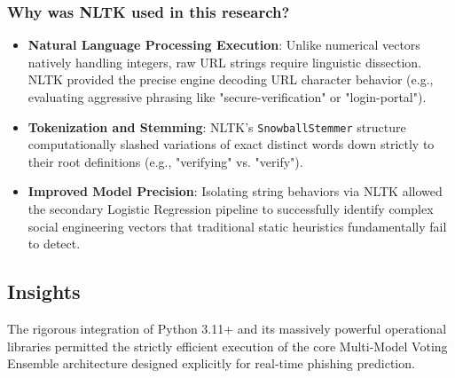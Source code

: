 \subsubsection{Why was NLTK used in this research?}

\begin{itemize}
\item \textbf{Natural Language Processing Execution}: Unlike numerical vectors natively handling integers, raw URL strings require linguistic dissection. NLTK provided the precise engine decoding URL character behavior (e.g., evaluating aggressive phrasing like "secure-verification" or "login-portal").
\item \textbf{Tokenization and Stemming}: NLTK's \texttt{SnowballStemmer} structure computationally slashed variations of exact distinct words down strictly to their root definitions (e.g., "verifying" vs. "verify").
\item \textbf{Improved Model Precision}: Isolating string behaviors via NLTK allowed the secondary Logistic Regression pipeline to successfully identify complex social engineering vectors that traditional static heuristics fundamentally fail to detect.
\end{itemize}

\subsection{Insights}
\noindent
The rigorous integration of Python 3.11+ and its massively powerful operational libraries permitted the strictly efficient execution of the core Multi-Model Voting Ensemble architecture designed explicitly for real-time phishing prediction.

